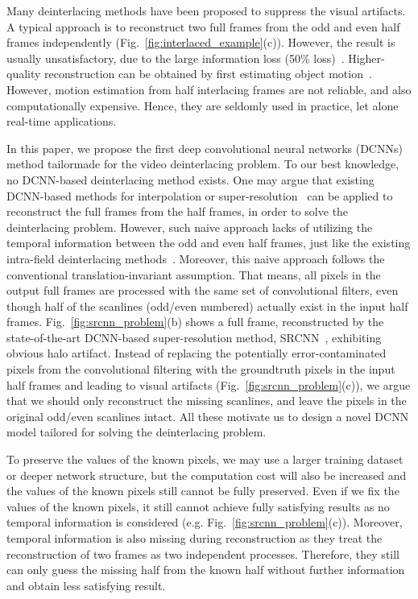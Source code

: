 \documentclass[acmtog]{acmart}
\begin{document}
Many deinterlacing methods have been proposed to suppress the visual artifacts.
A typical approach is to reconstruct two full frames from the odd and even half
frames independently (Fig.~\ref{fig:interlaced_example}(c)). However, the result
is usually unsatisfactory, due to the large information 
loss (50\% loss)~\cite{doyle1990interlaced,wang2012efficient,wang2013moving}. 
Higher-quality reconstruction can be obtained by first estimating object 
motion~\cite{jeon2009weighted,mohammadi2012enhanced,lee2013high}. However, motion
estimation from half interlacing frames are not reliable, and also computationally expensive.
Hence, they are seldomly used in practice, 
let alone real-time applications.





In this paper, we propose the first deep convolutional neural networks (DCNNs)
method tailormade for the video deinterlacing problem. To our best knowledge, no
DCNN-based deinterlacing method exists. One may argue that existing DCNN-based
methods for interpolation or super-resolution~\cite{mallat2016understanding,dong2016image} can be applied to
reconstruct the full frames from the half frames, in order to solve the
deinterlacing problem. However, such naive approach lacks of utilizing the
temporal information between the odd and even half frames, just like the existing
intra-field deinterlacing methods~\cite{doyle1990interlaced,wang2012efficient}. Moreover,
this naive approach follows the conventional translation-invariant assumption.
That means, all pixels in the output full frames are processed with the same set
of convolutional filters, even though half of the scanlines (odd/even numbered)
actually exist in the input half frames. Fig.~\ref{fig:srcnn_problem}(b) shows
a full frame, reconstructed by the state-of-the-art DCNN-based super-resolution method,
SRCNN~\cite{dong2016image}, exhibiting obvious halo artifact. 
Instead of replacing the potentially error-contaminated pixels from the convolutional filtering with the groundtruth
pixels in the input half frames and leading to visual artifacts
(Fig.~\ref{fig:srcnn_problem}(c)), we argue that we should only reconstruct the
missing scanlines, and leave the pixels in the original odd/even scanlines
intact. All these motivate us to design a novel DCNN model tailored for
solving the deinterlacing problem.


To
preserve the values of the known pixels, we may use a larger training dataset or
deeper network structure, but the computation cost will also be increased and
the values of the known pixels still cannot be fully preserved. Even if we fix
the values of the known pixels, it still cannot achieve fully satisfying results
as no temporal information is considered (e.g. Fig.~\ref{fig:srcnn_problem}(c)).
Moreover, temporal information is also missing during reconstruction as they
treat the reconstruction of two frames as two independent processes. Therefore,
they still can only guess the missing half from the known half without further
information and obtain less satisfying result. 
\fi 
\end{document}
